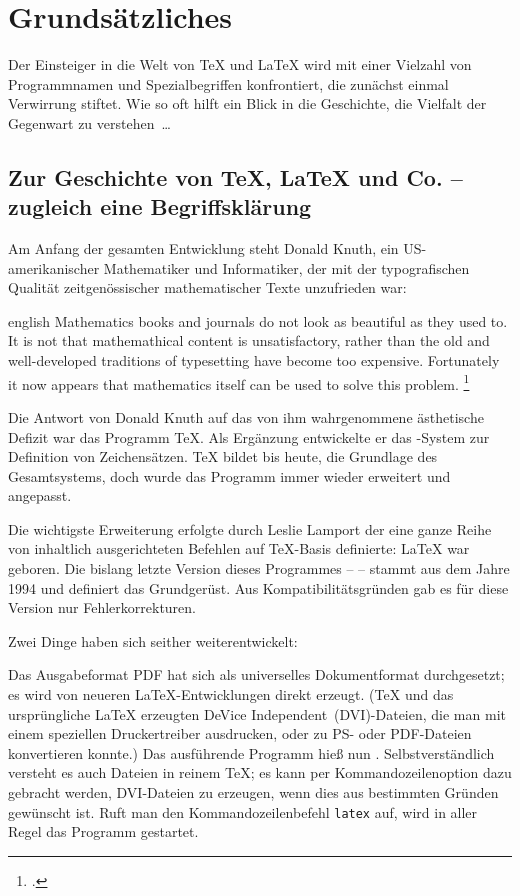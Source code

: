 \chapter{Grundsätzliches}

Der Einsteiger in die Welt von \TeX{} und \LaTeX{} wird mit einer Vielzahl von Programmnamen und 
Spezialbegriffen konfrontiert, die zunächst einmal Verwirrung stiftet.
Wie so oft hilft ein Blick in die Geschichte, die Vielfalt der Gegenwart zu verstehen~\dots


\section{Zur Geschichte von \TeX{}, \LaTeX{} und Co. -- zugleich eine Begriffsklärung}

Am Anfang der gesamten Entwicklung steht Donald Knuth, ein US-amerikanischer Mathematiker und 
Informatiker, der mit der typografischen Qualität zeitgenössischer mathematischer Texte 
unzufrieden war:

\begin{foreigndisplayquote}{english}
 Mathematics books and journals do not look as beautiful as they used to.
 It is not that mathemathical content is unsatisfactory, rather than the old and 
 well-developed traditions of typesetting have become too expensive.
 Fortunately it now appears that mathematics itself can be used to solve this problem.%
 \footcite[Zitiert nach:][1]{voss:einfuehrung}
\end{foreigndisplayquote}

Die Antwort von Donald Knuth auf das von ihm wahrgenommene ästhetische Defizit war das  
Programm \TeX. Als Ergänzung entwickelte er das \METAFONT-System zur Definition von 
Zeichensätzen.
\TeX{} bildet bis heute, die Grundlage des Gesamtsystems, doch wurde das Programm immer 
wieder erweitert und angepasst.

Die wichtigste Erweiterung erfolgte durch Leslie Lamport der eine ganze Reihe von 
inhaltlich ausgerichteten Befehlen auf \TeX-Basis definierte: \LaTeX{} war geboren.
Die bislang letzte Version dieses Programmes -- \LaTeXe{} -- stammt aus dem Jahre 1994
und definiert das Grundgerüst. Aus Kompatibilitätsgründen gab es für diese Version nur
Fehlerkorrekturen.

Zwei Dinge haben sich seither weiterentwickelt:

Das Ausgabeformat PDF hat sich als universelles Dokumentformat durchgesetzt; es wird von neueren
\LaTeX-Entwicklungen direkt erzeugt. (\TeX{} und das ursprüngliche \LaTeX{} erzeugten DeVice 
Independent~(DVI)-Dateien, die man mit einem speziellen Druckertreiber ausdrucken,
oder zu PS- oder PDF-Dateien konvertieren konnte.)
Das ausführende Programm hieß nun \pdfLaTeX. 
Selbstverständlich versteht es auch Dateien in reinem \TeX{};
es kann per Kommandozeilenoption dazu gebracht werden, DVI-Dateien zu erzeugen, wenn dies aus 
bestimmten Gründen gewünscht ist.
Ruft man den Kommandozeilenbefehl \lstinline/latex/ auf, wird in aller Regel das Programm 
\pdfLaTeX{} gestartet.

